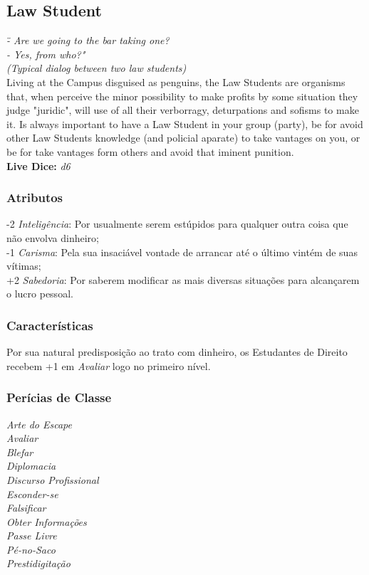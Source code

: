 \documentclass[ letterpaper,12pt]{article}
\begin{document}
\subsection{Law Student}
{\it \" - Are we going to the bar taking one?\\
        - Yes, from who?"\\(Typical dialog between two law students)}\\

Living at the Campus disguised as penguins, the Law Students are organisms that, when perceive the minor possibility to make profits by some situation they judge "juridic", will use of all their verborragy, deturpations and sofisms to make it. Is always important to have a Law Student in your group (party), be for avoid other Law Students knowledge (and policial aparate) to take vantages on you, or be for take vantages form others and avoid that iminent punition.\\

{\bf Live Dice:} {\it d6}

\subsubsection{Atributos}
-2 {\it Inteligência}: Por usualmente serem estúpidos para qualquer outra coisa que não envolva dinheiro;\\
-1 {\it Carisma}: Pela sua insaciável vontade de arrancar até o último vintém de suas vítimas;\\
+2 {\it Sabedoria}: Por saberem modificar as mais diversas situações para alcançarem o lucro pessoal.\\

\subsubsection{Características}

Por sua natural predisposição ao trato com dinheiro, os Estudantes de Direito recebem +1 em {\it Avaliar} logo no primeiro nível.

\subsubsection{Perícias de Classe}
{\it
Arte do Escape\\
Avaliar\\
Blefar\\
Diplomacia\\
Discurso Profissional\\
Esconder-se\\
Falsificar\\
Obter Informações\\
Passe Livre\\
Pé-no-Saco\\
Prestidigitação}
\end{document}
